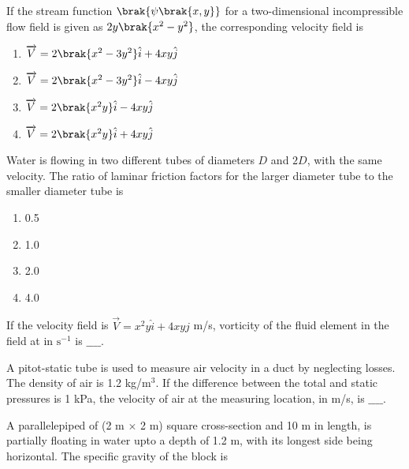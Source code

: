 \item If the stream function $\brak{\psi\brak{x,y}}$ for a two-dimensional incompressible flow field is given as $2y\brak{x^2 - y^2}$, the corresponding velocity field is 
\begin{enumerate}
    \item $\overrightarrow{V} = 2\brak{x^2 - 3y^2}\hat{i} + 4xy\hat{j}$
    \item $\overrightarrow{V} = 2\brak{x^2 - 3y^2}\hat{i} - 4xy\hat{j}$
    \item $\overrightarrow{V} = 2\brak{x^2y}\hat{i} - 4xy\hat{j}$
    \item $\overrightarrow{V} = 2\brak{x^2y}\hat{i} + 4xy\hat{j}$ \\
\end{enumerate}
\item Water is flowing in two different tubes of diameters $D$ and $2D$, with the same velocity. The ratio of laminar friction factors for the larger diameter tube to the smaller diameter tube is 
\begin{enumerate}
    \item 0.5
    \item 1.0
    \item 2.0
    \item 4.0 \\
\end{enumerate}
\item If the velocity field is $\overrightarrow{V} = x^2y\hat{i} + 4xy\hat{j}$ m/s, vorticity of the fluid element in the field at  in $\text{s}^{-1}$ is $\_\_\_\_$. \\
\item A pitot-static tube is used to measure air velocity in a duct by neglecting losses. The density of air is 1.2 kg/$\text{m}^3$. If the difference between the total and static pressures is 1 kPa, the velocity of air at the measuring location, in m/s, is $\_\_\_\_$. \\
\item A parallelepiped of (2 m $\times$ 2 m) square cross-section and 10 m in length, is partially floating in water upto a depth of 1.2 m, with its longest side being horizontal. The specific gravity of the block is
